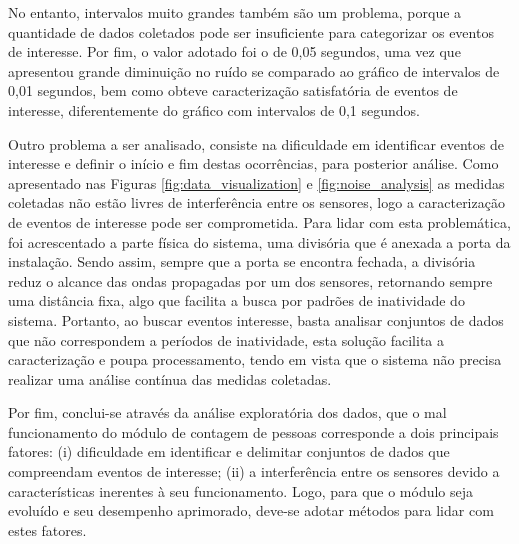 No entanto, intervalos muito grandes também são um problema, porque a quantidade de dados coletados pode ser insuficiente para categorizar os eventos de interesse. Por fim, o valor adotado foi o de 0,05 segundos, uma vez que apresentou grande diminuição no ruído se comparado ao gráfico de intervalos de 0,01 segundos, bem como obteve caracterização satisfatória de eventos de interesse, diferentemente do gráfico com intervalos de 0,1 segundos.

Outro problema a ser analisado, consiste na dificuldade em identificar eventos de interesse e definir o início e fim destas ocorrências, para posterior análise. Como apresentado nas Figuras \ref{fig:data_visualization} e \ref{fig:noise_analysis} as medidas coletadas não estão livres de interferência entre os sensores, logo a caracterização de eventos de interesse pode ser comprometida. Para lidar com esta problemática, foi acrescentado a parte física do sistema, uma divisória que é anexada a porta da instalação. Sendo assim, sempre que a porta se encontra fechada, a divisória reduz o alcance das ondas propagadas por um dos sensores, retornando sempre uma distância fixa, algo que facilita a busca por padrões de inatividade do sistema. Portanto, ao buscar eventos interesse, basta analisar conjuntos de dados que não correspondem a períodos de inatividade, esta solução facilita a caracterização e poupa processamento, tendo em vista que o sistema não precisa realizar uma análise contínua das medidas coletadas.

Por fim, conclui-se através da análise exploratória dos dados, que o mal funcionamento do módulo de contagem de pessoas corresponde a dois principais fatores: (i) dificuldade em identificar e delimitar conjuntos de dados que compreendam eventos de interesse; (ii) a interferência entre os sensores devido a características inerentes à seu funcionamento. Logo, para que o módulo seja evoluído e seu desempenho aprimorado, deve-se adotar métodos para lidar com estes fatores. 

